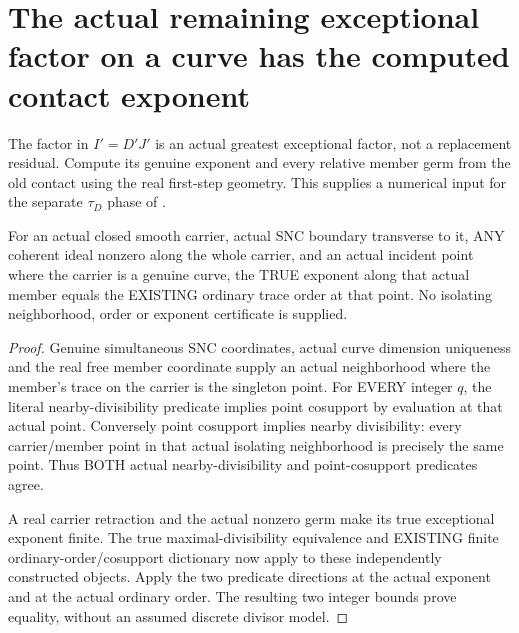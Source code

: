 \section{The actual remaining exceptional factor on a curve has the computed contact exponent}

The factor in $I'=D'J'$ is an actual greatest exceptional factor, not a
replacement residual. Compute its genuine exponent and every relative
member germ from the old contact using the real first-step geometry.
This supplies a numerical input for the separate $\tau_D$ phase of
\cite[pp.~293--295]{bierstone-milman97-invent-math}.

\begin{theorem}
\label{hir:sharp-actual-curve-member-exponent-equals-point-order}
\leanok
For an actual closed smooth carrier, actual SNC boundary transverse to it,
ANY coherent ideal nonzero along the whole carrier, and an actual incident
point where the carrier is a genuine curve, the TRUE exponent along that
actual member equals the EXISTING ordinary trace order at that point.
No isolating neighborhood, order or exponent certificate is supplied.
\end{theorem}
\begin{proof}
Genuine simultaneous SNC coordinates, actual curve dimension uniqueness
and the real free member coordinate supply an actual neighborhood where
the member's trace on the carrier is the singleton point. For EVERY
integer $q$, the literal nearby-divisibility predicate implies point
cosupport by evaluation at that actual point. Conversely point cosupport
implies nearby divisibility: every carrier/member point in that actual
isolating neighborhood is precisely the same point. Thus BOTH actual
nearby-divisibility and point-cosupport predicates agree.

A real carrier retraction and the actual nonzero germ make its true
exceptional exponent finite. The true maximal-divisibility equivalence
and EXISTING finite ordinary-order/cosupport dictionary now apply to these
independently constructed objects. Apply the two predicate directions at
the actual exponent and at the actual ordinary order. The resulting two
integer bounds prove equality, without an assumed discrete divisor model.
\end{proof}


